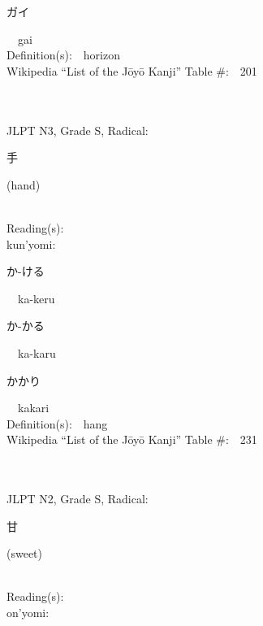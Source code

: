 \begin{multicols}{2}
{\hspace*{2em}}{\begin{CJK}{UTF8}{min} ガイ \end{CJK}}\ \ gai\ \ \\
Definition(s):\ \ horizon \\
Wikipedia ``List of the J\=oy\=o Kanji'' Table \#:\ \ 201 \\
\ \ \\
{\fontsize{34pt}{40pt}  }\ \ \\  %
{JLPT N3, Grade S, Radical:\ \ {\begin{CJK}{UTF8}{min} 手 \end{CJK}} (hand) } \\
Reading(s):\ \ \\
{\hspace*{1em}}kun'yomi:\ \ \\
{\hspace*{2em}}{\begin{CJK}{UTF8}{min} か-ける \end{CJK}}\ \ ka-keru\ \ \\
{\hspace*{2em}}{\begin{CJK}{UTF8}{min} か-かる \end{CJK}}\ \ ka-karu\ \ \\
{\hspace*{2em}}{\begin{CJK}{UTF8}{min} かかり \end{CJK}}\ \ kakari\ \ \\
Definition(s):\ \ hang \\
Wikipedia ``List of the J\=oy\=o Kanji'' Table \#:\ \ 231 \\
\ \ \\
{\fontsize{34pt}{40pt}  }\ \ \\  %
{JLPT N2, Grade S, Radical:\ \ {\begin{CJK}{UTF8}{min} 甘 \end{CJK}} (sweet) } \\
Reading(s):\ \ \\
{\hspace*{1em}}on'yomi:\ \ \\

\end{multicols}
